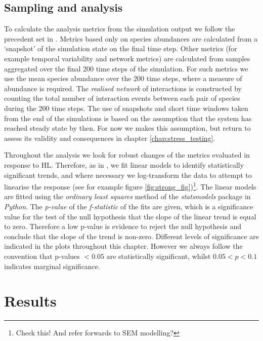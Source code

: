 \subsection{Sampling and analysis}
\label{sec:sampling}

To calculate the analysis metrics from the simulation output we follow the precedent set in \cite{lurgi2015effects}. Metrics based only on species abundances are calculated from a `snapshot' of the simulation state on the final time step. Other metrics (for example temporal variability and network metrics) are calculated from samples aggregated over the final 200 time steps of the simulation. For such metrics we use the mean species abundance over the 200 time steps, where a measure of abundance is required. The \emph{realised network} of interactions is constructed by counting the total number of interaction events between each pair of species during the 200 time steps. The use of snapshots and short time windows taken from the end of the simulations is based on the assumption that the system has reached steady state by then. For now we makes this assumption, but return to assess its validity and consequences in chapter \ref{chap:stress_testing}.

Throughout the analysis we look for robust changes of the metrics evaluated in response to HL. Therefore, as in \cite{lurgi2015effects}, we fit linear models to identify statistically significant trends, and where necessary we log-transform the data to attempt to linearise the response (see for example figure \ref{fig:strong_fig})\footnote{Check this! And refer forwards to SEM modelling?}. The linear models are fitted using the \emph{ordinary least squares} method of the \emph{statsmodels} package in \emph{Python}. The \emph{p-value} of the \emph{f-statistic} of the fits are given, which is a significance value for the test of the null hypothesis that the slope of the linear trend is equal to zero. Therefore a low p-value is evidence to reject the null hypothesis and conclude that the slope of the trend is non-zero. Different levels of significance are indicated in the plots throughout this chapter. However we always follow the convention that p-values $<0.05$ are statistically significant, whilst $0.05 < p < 0.1$ indicates marginal significance. 

\section{Results}
\label{sec:hir_results}


